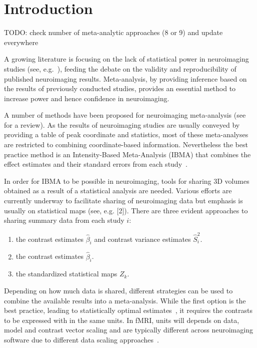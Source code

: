 \documentclass[preprint]{elsarticle}
\newcommand{\effectvector}{\hat\beta}
\newcommand{\effect}[1][i]{\effectvector_{#1}}
\newcommand{\vareffect}[1][i]{\hat S^2_{#1}}
\newcommand{\zeffect}[1][\studyidx]{Z_{#1}}
\newcommand{\studyidx}{k}
\begin{document}
\section{Introduction}

TODO: check number of meta-analytic approaches (8 or 9) and update everywhere

A growing literature is focusing on the lack of statistical power in neuroimaging studies (see, e.g.~\cite{Button2013}), feeding the debate on the validity and reproducibility of published neuroimaging results. Meta-analysis, by providing inference based on the results of previously conducted studies, provides an essential method to increase power and hence confidence in neuroimaging.

A number of methods have been proposed for neuroimaging meta-analysis (see~\cite{Radua2012} for a review). As the results of neuroimaging studies are usually conveyed by providing a table of peak coordinate and statistics, most of these meta-analyses are restricted to combining coordinate-based information. Nevertheless the best practice method is an Intensity-Based Meta-Analysis (IBMA) that combines the effect estimates and their standard errors from each study~\cite{Salimi-khorshidi2009}. 

In order for IBMA to be possible in neuroimaging, tools for sharing 3D volumes obtained as a result of a statistical analysis are needed. Various efforts are currently underway to facilitate sharing of neuroimaging data but emphasis is usually on statistical maps (see, e.g. [2]). There are three evident approaches to sharing summary data from each study $i$:
\begin{enumerate}
	\item the contrast estimates $\effect$ and contrast variance estimates $\vareffect$.
	\item the contrast estimates $\effect$.	
	\item the standardized statistical maps $\zeffect$.		
\end{enumerate}

Depending on how much data is shared, different strategies can be used to combine the available results into a meta-analysis. While the first option is the best practice, leading to statistically optimal estimates~\cite{Cummings2004}, it requires the contrasts to be expressed with in the same units. In fMRI, units will depends on data, model and contrast vector scaling and are typically different across neuroimaging software due to different data scaling approaches~\cite{Nichols2012units}.
\end{document}
